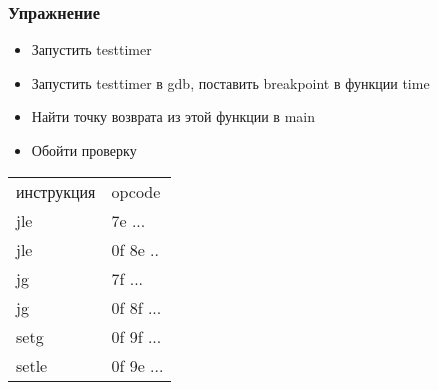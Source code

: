 \begin{frame}
  \frametitle{Упражнение}
  \begin{itemize}
    \item Запустить testtimer
    \item Запустить testtimer в gdb, поставить breakpoint в функции time
    \item Найти точку возврата из этой функции в main
    \item Обойти проверку
  \end{itemize}
  \begin{tabular}{ll}
    инструкция & opcode \\
    jle        & 7e ... \\
    jle        & 0f 8e .. \\
    jg         & 7f ... \\
    jg         & 0f 8f ...\\
    setg       & 0f 9f ... \\
    setle      & 0f 9e ... \\
  \end{tabular}
\end{frame}
